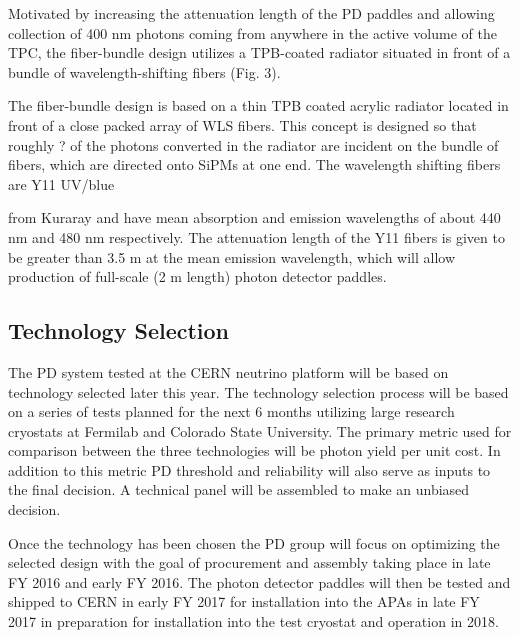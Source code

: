 Motivated by increasing the attenuation length of the PD paddles and allowing collection of 400 nm photons coming from anywhere in the active volume of the TPC, the fiber-bundle design utilizes a TPB-coated radiator situated in front of a bundle of wavelength-shifting fibers (Fig. 3).  

The fiber-bundle design is based on a thin TPB coated acrylic radiator located in front of a close packed array of WLS fibers. This concept is designed so that roughly ? of the photons converted in the radiator are incident on the bundle of fibers, which are directed onto SiPMs at one end. The wavelength shifting fibers are Y11 UV/blue 

   from Kuraray and have mean absorption and emission wavelengths of about 440 nm and 480 nm respectively.  The attenuation length of the Y11 fibers is given to be greater than 3.5 m at the mean emission wavelength, which will allow production of full-scale (2 m length) photon detector paddles.

\subsection{Technology Selection}

The PD system tested at the CERN neutrino platform will be based on technology selected later this year. The technology selection process will be based on a series of tests planned for the next 6 months utilizing large research cryostats at Fermilab and Colorado State University. The primary metric used for comparison between the three technologies will be photon yield per unit cost. In addition to this metric PD threshold and reliability will also serve as inputs to the final decision. A technical panel will be assembled to make an unbiased decision. 

Once the technology has been chosen the PD group will focus on optimizing the selected design with the goal of procurement and assembly taking place in late FY 2016 and early FY 2016. The photon detector paddles will then be tested and shipped to CERN in early FY 2017 for installation into the APAs in late FY 2017 in preparation for installation into the test cryostat and operation in 2018. 

